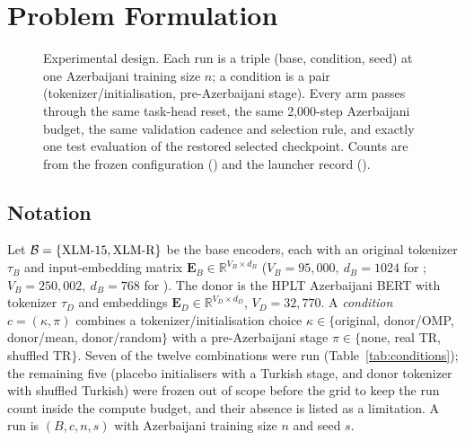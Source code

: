 \section{Problem Formulation}
\label{sec:problem}

\begin{figure}[!t]
\centering
\resizebox{\textwidth}{!}{}
\caption{Experimental design. Each run is a triple (base, condition, seed) at one Azerbaijani training size $n$; a condition is a pair (tokenizer/initialisation, pre-Azerbaijani stage). Every arm passes through the same task-head reset, the same 2{,}000-step Azerbaijani budget, the same validation cadence and selection rule, and exactly one test evaluation of the restored selected checkpoint. Counts are from the frozen configuration () and the launcher record ().}
\label{fig:design}
\end{figure}

\subsection{Notation}
Let $\mathcal{B}=\{\text{XLM-15},\text{XLM-R}\}$ be the base encoders, each with an original tokenizer $\tau_B$ and input-embedding matrix $\mathbf{E}_B\in\mathbb{R}^{V_B\times d_B}$ ($V_B=95{,}000,\ d_B=1024$ for \xlmxv; $V_B=250{,}002,\ d_B=768$ for \xlmr). The donor is the HPLT Azerbaijani BERT with tokenizer $\tau_D$ and embeddings $\mathbf{E}_D\in\mathbb{R}^{V_D\times d_D}$, $V_D=32{,}770$. A \emph{condition} $c=(\kappa,\pi)$ combines a tokenizer/initialisation choice $\kappa\in\{$original, donor/OMP, donor/mean, donor/random$\}$ with a pre-Azerbaijani stage $\pi\in\{$none, real TR, shuffled TR$\}$. Seven of the twelve combinations were run (Table~\ref{tab:conditions}); the remaining five (placebo initialisers with a Turkish stage, and donor tokenizer with shuffled Turkish) were frozen out of scope before the grid to keep the run count inside the compute budget, and their absence is listed as a limitation. A run is $(B,c,n,s)$ with Azerbaijani training size $n$ and seed $s$.

